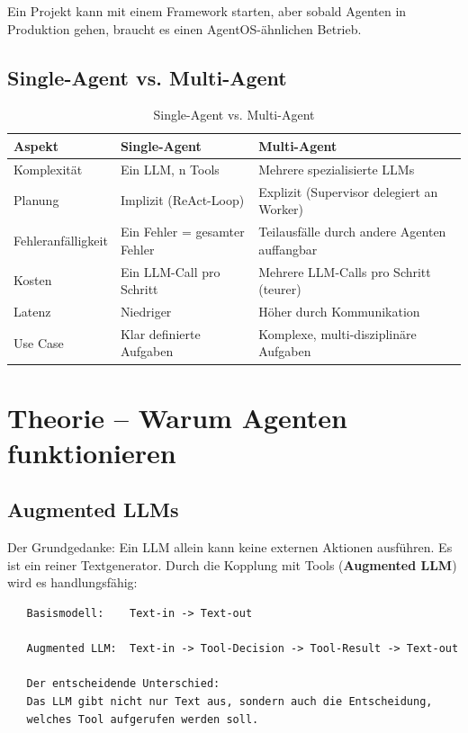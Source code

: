 Ein Projekt kann mit einem Framework starten, aber sobald Agenten in Produktion gehen, braucht es einen AgentOS-ähnlichen Betrieb.

\subsection{Single-Agent vs. Multi-Agent}

\begin{table}[H]
\centering
\begin{tabularx}{\linewidth}{lXX}
\toprule
\textbf{Aspekt} & \textbf{Single-Agent} & \textbf{Multi-Agent} \\
\midrule
Komplexität & Ein LLM, n Tools & Mehrere spezialisierte LLMs \\
Planung & Implizit (ReAct-Loop) & Explizit (Supervisor delegiert an Worker) \\
Fehleranfälligkeit & Ein Fehler = gesamter Fehler & Teilausfälle durch andere Agenten auffangbar \\
Kosten & Ein LLM-Call pro Schritt & Mehrere LLM-Calls pro Schritt (teurer) \\
Latenz & Niedriger & Höher durch Kommunikation \\
Use Case & Klar definierte Aufgaben & Komplexe, multi-disziplinäre Aufgaben \\
\midrule
\end{tabularx}
\caption{Single-Agent vs. Multi-Agent}
\label{tab:agenttypes}
\end{table}

\section{Theorie -- Warum Agenten funktionieren}

\subsection{Augmented LLMs}

Der Grundgedanke: Ein LLM allein kann keine externen Aktionen ausführen. Es ist ein reiner Textgenerator. Durch die Kopplung mit Tools (\textbf{Augmented LLM}) wird es handlungsfähig:

\begin{verbatim}
   Basismodell:    Text-in -> Text-out

   Augmented LLM:  Text-in -> Tool-Decision -> Tool-Result -> Text-out

   Der entscheidende Unterschied:
   Das LLM gibt nicht nur Text aus, sondern auch die Entscheidung,
   welches Tool aufgerufen werden soll.
\end{verbatim}

